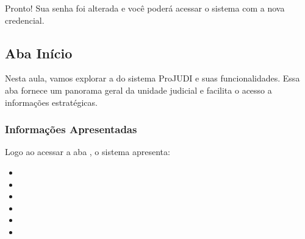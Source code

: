 \documentclass[letterpaper,10pt,brazil]{sphinxmanual}
\begin{document}
\sphinxAtStartPar
Pronto! Sua senha foi alterada e você poderá acessar o sistema com a nova credencial.

\sphinxstepscope


\subsection{Aba Início}
\label{\detokenize{projud_03_abainicio:aba-inicio}}\label{\detokenize{projud_03_abainicio::doc}}
\sphinxAtStartPar
Nesta aula, vamos explorar a  do sistema ProJUDI e suas funcionalidades. Essa aba fornece um panorama geral da unidade judicial e facilita o acesso a informações estratégicas.


\subsubsection{Informações Apresentadas}
\label{\detokenize{projud_03_abainicio:informacoes-apresentadas}}
\sphinxAtStartPar
Logo ao acessar a aba , o sistema apresenta:
\begin{itemize}
\item {} 
\sphinxAtStartPar
{}

\item {} 
\sphinxAtStartPar
{}

\item {} 
\sphinxAtStartPar
{}

\item {} 
\sphinxAtStartPar
{}

\item {} 
\sphinxAtStartPar
{}

\item {} 
\sphinxAtStartPar
{}

\end{itemize}
\end{document}
